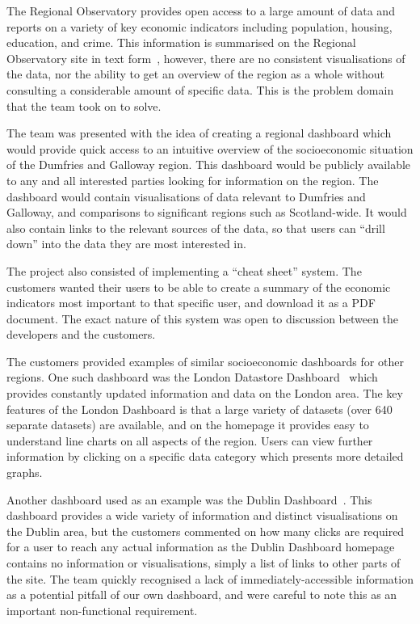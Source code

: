 \documentclass{l3proj}
\begin{document}

The Regional Observatory provides open access to a large amount of data and reports on a variety of key economic indicators including population, housing, education, and crime. This information is summarised on the Regional Observatory site in text form~\cite{CrichtonInstituteRegionalObservatory}, however, there are no consistent visualisations of the data, nor the ability to get an overview of the region as a whole without consulting a considerable amount of specific data. This is the problem domain that the team took on to solve.

The team was presented with the idea of creating a regional dashboard which would provide quick access to an intuitive overview of the socioeconomic situation of the Dumfries and Galloway region. This dashboard would be publicly available to any and all interested parties looking for information on the region. The dashboard would contain visualisations of data relevant to Dumfries and Galloway, and comparisons to significant regions such as Scotland-wide. It would also contain links to the relevant sources of the data, so that users can ``drill down'' into the data they are most interested in.

The project also consisted of implementing a ``cheat sheet'' system. The customers wanted their users to be able to create a summary of the economic indicators most important to that specific user, and download it as a PDF document. The exact nature of this system was open to discussion between the developers and the customers.

The customers provided examples of similar socioeconomic dashboards for other regions. One such dashboard was the London Datastore Dashboard~\cite{LondonDashboard} which provides constantly updated information and data on the London area. The key features of the London Dashboard is that a large variety of datasets (over 640 separate datasets) are available, and on the homepage it provides easy to understand line charts on all aspects of the region. Users can view further information by clicking on a specific data category which presents more detailed graphs.

Another dashboard used as an example was the Dublin Dashboard~\cite{DublinDashboard}. This dashboard provides a wide variety of information and distinct visualisations on the Dublin area, but the customers commented on how many clicks are required for a user to reach any actual information as the Dublin Dashboard homepage contains no information or visualisations, simply a list of links to other parts of the site. The team quickly recognised a lack of immediately-accessible information as a potential pitfall of our own dashboard, and were careful to note this as an important non-functional requirement.
\end{document}
